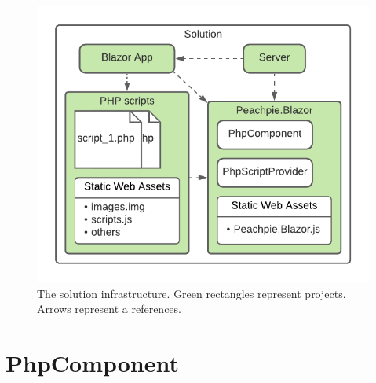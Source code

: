 \begin{figure}[!b]\centering
\includegraphics[scale=0.9]{./img/SolutionInfrastructure}
\caption{The solution infrastructure. Green rectangles represent projects. Arrows represent a references.}
\label{img13:infrastructure}
\end{figure} 

\section{PhpComponent}

